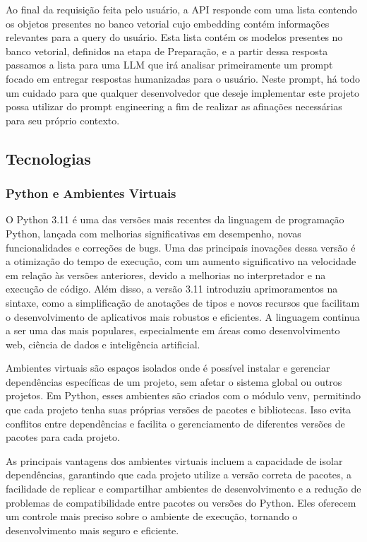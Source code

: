 \documentclass[a4paper, 12pt]{article}
\begin{document}
    Ao final da requisição feita pelo usuário, a API responde com uma lista contendo os objetos presentes no banco vetorial cujo embedding contém informações relevantes para a query do usuário. Esta lista contém os modelos presentes no banco vetorial, definidos na etapa de Preparação, e a partir dessa resposta passamos a lista para uma LLM que irá analisar primeiramente um prompt focado em entregar respostas humanizadas para o usuário. Neste prompt, há todo um cuidado para que qualquer desenvolvedor que deseje implementar este projeto possa utilizar do prompt engineering a fim de realizar as afinações necessárias para seu próprio contexto.

    \subsection{Tecnologias}

    \subsubsection{Python e Ambientes Virtuais}
    
    O Python 3.11 é uma das versões mais recentes da linguagem de programação Python, lançada com melhorias significativas em desempenho, novas funcionalidades e correções de bugs. Uma das principais inovações dessa versão é a otimização do tempo de execução, com um aumento significativo na velocidade em relação às versões anteriores, devido a melhorias no interpretador e na execução de código. Além disso, a versão 3.11 introduziu aprimoramentos na sintaxe, como a simplificação de anotações de tipos e novos recursos que facilitam o desenvolvimento de aplicativos mais robustos e eficientes. A linguagem continua a ser uma das mais populares, especialmente em áreas como desenvolvimento web, ciência de dados e inteligência artificial.
    
    Ambientes virtuais são espaços isolados onde é possível instalar e gerenciar dependências específicas de um projeto, sem afetar o sistema global ou outros projetos. Em Python, esses ambientes são criados com o módulo venv, permitindo que cada projeto tenha suas próprias versões de pacotes e bibliotecas. Isso evita conflitos entre dependências e facilita o gerenciamento de diferentes versões de pacotes para cada projeto.

    As principais vantagens dos ambientes virtuais incluem a capacidade de isolar dependências, garantindo que cada projeto utilize a versão correta de pacotes, a facilidade de replicar e compartilhar ambientes de desenvolvimento e a redução de problemas de compatibilidade entre pacotes ou versões do Python. Eles oferecem um controle mais preciso sobre o ambiente de execução, tornando o desenvolvimento mais seguro e eficiente.
\end{document}
